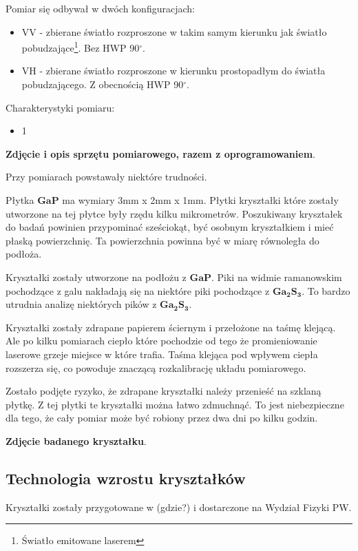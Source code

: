 Pomiar się odbywał w dwóch konfiguracjach:
\begin{itemize}
	\item VV - zbierane światło rozproszone w takim samym kierunku jak światło pobudzające\footnote{Światło emitowane laserem}. Bez HWP 90$^{\circ}$.
	\item VH - zbierane światło rozproszone w kierunku prostopadłym do światła pobudzającego. Z obecnością HWP 90$^{\circ}$.
\end{itemize} 

Charakterystyki pomiaru:
\begin{itemize}
	\item 1
\end{itemize}

\textbf{Zdjęcie i opis sprzętu pomiarowego, razem z oprogramowaniem}.

Przy pomiarach powstawały niektóre trudności.

Płytka $\mathbf{GaP}$ ma wymiary 3mm x 2mm x 1mm. Płytki kryształki które zostały utworzone na tej płytce były rzędu kilku mikrometrów. Poszukiwany kryształek do badań powinien przypominać sześciokąt, być osobnym kryształkiem i mieć płaską powierzchnię. Ta powierzchnia powinna być w miarę równoległa do podłoża.

Kryształki zostały utworzone na podłożu z $\mathbf{GaP}$. Piki na widmie ramanowskim pochodzące z galu nakładają się na niektóre piki pochodzące z $\mathbf{Ga_{2}S_{3}}$. To bardzo utrudnia analizę niektórych pików z $\mathbf{Ga_{2}S_{3}}$.

Kryształki zostały zdrapane papierem ściernym i przełożone na taśmę klejącą. Ale po kilku pomiarach ciepło które pochodzie od tego że promieniowanie laserowe grzeje miejsce w które trafia. Taśma klejąca pod wpływem ciepła rozszerza się, co powoduje znaczącą rozkalibrację układu pomiarowego. 

Zostało podjęte ryzyko, że zdrapane kryształki należy przenieść na szklaną płytkę. Z tej płytki te kryształki można łatwo zdmuchnąć. To jest niebezpieczne dla tego, że cały pomiar może być robiony przez dwa dni po kilku godzin.

\textbf{Zdjęcie badanego kryształku}. 

\subsection{Technologia wzrostu kryształków}

Kryształki zostały przygotowane w (gdzie?) i dostarczone na Wydział Fizyki PW. 

